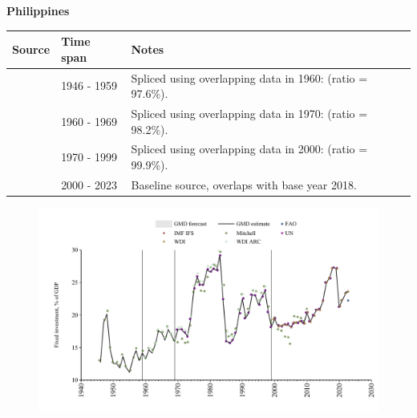 \documentclass[12pt,a4paper,landscape]{article}
\begin{document}
\begin{adjustbox}{max totalsize={\paperwidth}{\paperheight},center}
\begin{minipage}[t][\textheight][t]{\textwidth}
\vspace*{0.5cm}
{}
\begin{center}
{\Large\bfseries Philippines}
\end{center}
\vspace{0.5cm}
\begin{table}[H]
\centering
\small
\begin{tabular}{|l|l|l|}
\hline
\textbf{Source} & \textbf{Time span} & \textbf{Notes} \\
\hline
\rowcolor{white}\cite{Mitchell}& 1946 - 1959 &Spliced using overlapping data in 1960: (ratio = 97.6\%).\\
\rowcolor{lightgray}\cite{WDI_ARC}& 1960 - 1969 &Spliced using overlapping data in 1970: (ratio = 98.2\%).\\
\rowcolor{white}\cite{UN}& 1970 - 1999 &Spliced using overlapping data in 2000: (ratio = 99.9\%).\\
\rowcolor{lightgray}\cite{WDI}& 2000 - 2023 &Baseline source, overlaps with base year 2018.\\
\hline
\end{tabular}
\end{table}
\begin{figure}[H]
\centering
\includegraphics[width=\textwidth,height=0.6\textheight,keepaspectratio]{graphs/PHL_finv_GDP.pdf}
\end{figure}
\end{minipage}
\end{adjustbox}
\end{document}
